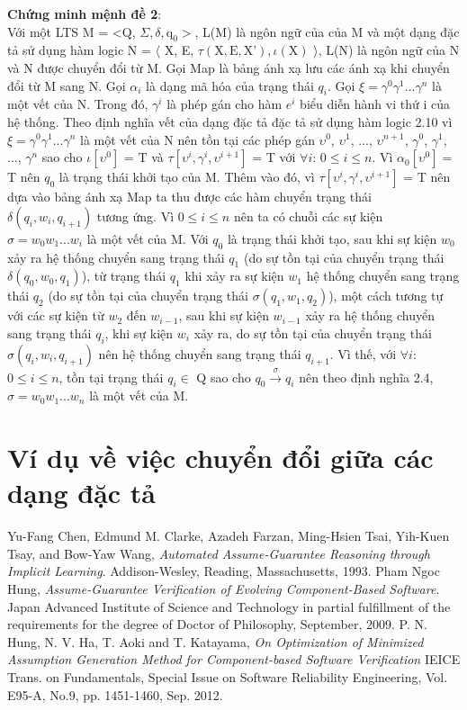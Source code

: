 \documentclass[a4paper,13pt,oneside,openany]{book}
\begin{document}
\begin{flushleft}
		\textbf{Chứng minh mệnh đề 2}:\\
		Với một LTS M = <Q, $\Sigma, \delta, \textrm{q}_0>$, L(M) là ngôn ngữ của của M và một dạng đặc tả sử dụng hàm logic N = $\langle$ X, E, $\tau(\textrm{X}, \textrm{E}, \textrm{X'}), \iota(\textrm{X})$ $\rangle$, L(N) là ngôn ngữ của N và N được chuyển đổi từ M.
		Gọi Map là bảng ánh xạ lưu các ánh xạ khi chuyển đổi từ M sang N. Gọi $\alpha_i$ là dạng mã hóa của trạng thái $q_i$. Gọi $\xi = \gamma^0\gamma^1...\gamma^n$ là một vết của N. 
		Trong đó, $\gamma^i$ là phép gán cho hàm $e^i$ biểu diễn hành vi thứ i của hệ thống. Theo định nghĩa vết của dạng đặc tả đặc tả sử dụng hàm logic 2.10 vì $\xi = \gamma^0\gamma^1...\gamma^n$ là một vết của N nên tồn tại các phép gán $\upsilon^0$, $\upsilon^1$, ..., $\upsilon^{n+1}$, $\gamma^0$, $\gamma^1$, ..., $\gamma^n$ sao cho $\iota[\upsilon^0]$ = T và $\tau[\upsilon^i, \gamma^i, \upsilon^{i+1}]$ = T với $\forall i$: $0 \leq i \leq n$. Vì $\alpha_0[\upsilon^0] =$ T nên $q_0$ là trạng thái khởi tạo của M. Thêm vào đó, vì $\tau[\upsilon^i, \gamma^i, \upsilon^{i+1}]$ = T nên dựa vào bảng ánh xạ Map ta thu được các hàm chuyển trạng thái $\delta(q_i, w_i, q_{i+1})$ tương ứng. Vì $0 \leq i \leq n$ nên ta có chuỗi các sự kiện $\sigma = w_0w_1...w_i$ là một vết của M. Với $q_0$ là trạng thái khởi tạo, sau khi sự kiện $w_0$ xảy ra hệ thống chuyển sang trạng thái $q_1$ (do sự tồn tại của chuyển trạng thái $\delta(q_0, w_0, q_1)$), từ trạng thái $q_1$ khi xảy ra sự kiện $w_1$ hệ thống chuyển sang trạng thái $q_2$ (do sự tồn tại của chuyển trạng thái $\sigma(q_1, w_1, q_2)$), một cách tương tự với các sự kiện từ $w_2$ đến $w_{i-1}$, sau khi sự kiện $w_{i-1}$ xảy ra hệ thống chuyển sang trạng thái $q_i$, khi sự kiện $w_i$ xảy ra, do sự tồn tại của chuyển trạng thái $\sigma(q_i, w_i, q_{i+1})$ nên hệ thống chuyển sang trạng thái $q_{i+1}$. Vì thế, với $\forall i$: $0 \leq i \leq n$, tồn tại trạng thái $q_i \in$ Q sao cho $q_0 \overset{\sigma}{\longrightarrow} q_{i}$ nên theo định nghĩa 2.4, $\sigma = w_0w_1...w_n$ là một vết của M.
	\chapter{Ví dụ về việc chuyển đổi giữa các dạng đặc tả}
	
	\end{flushleft}
\begin{thebibliography}{9}
	Yu-Fang Chen, Edmund M. Clarke, Azadeh Farzan, Ming-Hsien Tsai,
	Yih-Kuen Tsay, and Bow-Yaw Wang, \textit{Automated Assume-Guarantee Reasoning
		through Implicit Learning}. 
	Addison-Wesley, Reading, Massachusetts, 1993.
	Pham Ngoc Hung, \textit{Assume-Guarantee Verification of Evolving Component-Based Software}.
	Japan Advanced Institute of Science and Technology in partial fulfillment of the requirements for the degree of Doctor of Philosophy, September, 2009.
	P. N. Hung, N. V.  Ha, T. Aoki and T. Katayama, \textit{On Optimization of Minimized Assumption Generation Method for Component-based Software Verification}
	IEICE Trans. on Fundamentals, Special Issue on Software Reliability Engineering, Vol. E95-A, No.9, pp. 1451-1460, Sep. 2012.
\end{thebibliography}
\end{document}
